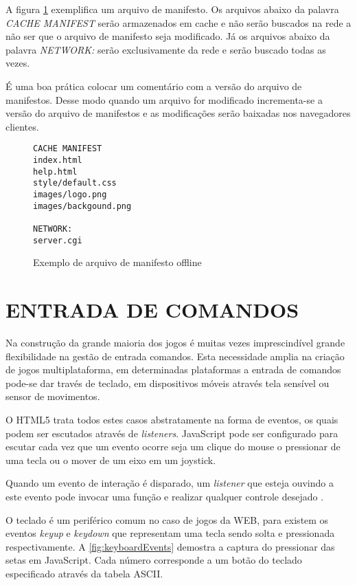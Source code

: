 A figura \ref{fig:offline} exemplifica um arquivo de manifesto. Os
arquivos abaixo da palavra \textit{CACHE MANIFEST} serão armazenados
em cache e não serão buscados na rede a não ser que o arquivo
de manifesto seja modificado. Já os arquivos abaixo da palavra
\textit{NETWORK:} serão exclusivamente da rede e serão buscado todas
as vezes.

É uma boa prática colocar um comentário com a versão do arquivo de
manifestos. Desse modo quando um arquivo for modificado incrementa-se a
versão do arquivo de manifestos e as modificações serão baixadas nos
navegadores clientes.

\begin{figure}[H]
\centering
\begin{verbatim}
CACHE MANIFEST
index.html
help.html
style/default.css
images/logo.png
images/backgound.png

NETWORK:
server.cgi
\end{verbatim}
\caption{Exemplo de arquivo de manifesto offline}
\label{fig:offline}
\end{figure}

\section{ENTRADA DE COMANDOS}
Na construção da grande maioria dos jogos é muitas vezes
imprescindível grande flexibilidade na gestão de entrada comandos.
Esta necessidade amplia na criação de jogos multiplataforma, em
determinadas plataformas a entrada de comandos pode-se dar través de
teclado, em dispositivos móveis através tela sensível ou sensor de
movimentos.

O HTML5 trata todos estes casos abstratamente na forma de eventos, os
quais podem ser escutados através de \textit{listeners}. JavaScript
pode ser configurado para escutar cada vez que um evento ocorre seja um
clique do mouse o pressionar de uma tecla ou o mover de um eixo em um
joystick.

Quando um evento de interação é disparado, um \textit{listener}
que esteja ouvindo a este evento pode invocar uma função e realizar
qualquer controle desejado \autocite{buildingHtml5Game}.

O teclado é um periférico comum no caso de jogos da WEB, para existem
os eventos \textit{keyup} e \textit{keydown} que representam uma tecla
sendo solta e pressionada respectivamente. A \ref{fig:keyboardEvents}
demostra a captura do pressionar das setas em JavaScript. Cada
número corresponde a um botão do teclado especificado através da tabela ASCII.

